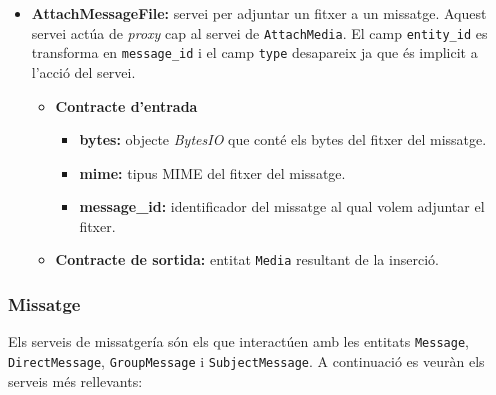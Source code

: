 \begin{itemize}
			\item \textbf{AttachMessageFile:} servei per adjuntar un fitxer a un missatge. Aquest servei actúa de \emph{proxy} cap al servei de \texttt{AttachMedia}. El camp \texttt{entity\_id} es transforma en \texttt{message\_id} i el camp \texttt{type} desapareix ja que és implicit a l'acció del servei.
			
			\begin{itemize}
					\item \textbf{Contracte d'entrada}
						\begin{itemize}
							\item \textbf{bytes:} objecte \emph{BytesIO} que conté els bytes del fitxer del missatge.
							\item \textbf{mime:} tipus \ac{MIME} del fitxer del missatge.
							\item \textbf{message\_id:} identificador del missatge al qual volem adjuntar el fitxer.
						\end{itemize}
					\item \textbf{Contracte de sortida:} entitat \texttt{Media} resultant de la inserció.
				\end{itemize}
		\end{itemize}
				
		\subsubsection{Missatge}
		
		Els serveis de missatgería són els que interactúen amb les entitats \texttt{Message}, \texttt{DirectMessage}, \texttt{GroupMessage} i \texttt{SubjectMessage}. A continuació es veuràn els serveis més rellevants:
		
